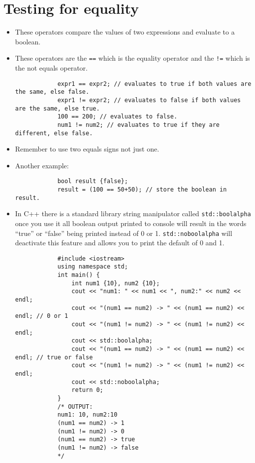 \section{Testing for equality}
\begin{itemize}
    \item These operators compare the values of two expressions and evaluate to a boolean.
    \item These operators are the \texttt{==} which is the equality operator and the \texttt{!=} which is the not equals operator.
        \begin{verbatim}
            expr1 == expr2; // evaluates to true if both values are the same, else false.
            expr1 != expr2; // evaluates to false if both values are the same, else true.
            100 == 200; // evaluates to false.
            num1 != num2; // evaluates to true if they are different, else false.
        \end{verbatim}
    \item Remember to use two equals signs not just one.
    \item Another example: 
        \begin{verbatim}
            bool result {false};
            result = (100 == 50+50); // store the boolean in result.
        \end{verbatim}
    
    \item In C++ there is a standard library string manipulator called \texttt{std::boolalpha} once you use it all boolean output printed to console will result in the words ``true'' or ``false'' being printed instead of 0 or 1. \texttt{std::noboolalpha} will deactivate this feature and allows you to print the default of 0 and 1.
        \begin{verbatim}
            #include <iostream>
            using namespace std;
            int main() {
                int num1 {10}, num2 {10};
                cout << "num1: " << num1 << ", num2:" << num2 << endl;
                cout << "(num1 == num2) -> " << (num1 == num2) << endl; // 0 or 1
                cout << "(num1 != num2) -> " << (num1 != num2) << endl;
                cout << std::boolalpha;
                cout << "(num1 == num2) -> " << (num1 == num2) << endl; // true or false
                cout << "(num1 != num2) -> " << (num1 != num2) << endl;
                cout << std::noboolalpha;
                return 0;
            }
            /* OUTPUT:
            num1: 10, num2:10
            (num1 == num2) -> 1
            (num1 != num2) -> 0
            (num1 == num2) -> true
            (num1 != num2) -> false
            */
        \end{verbatim}
\end{itemize}

